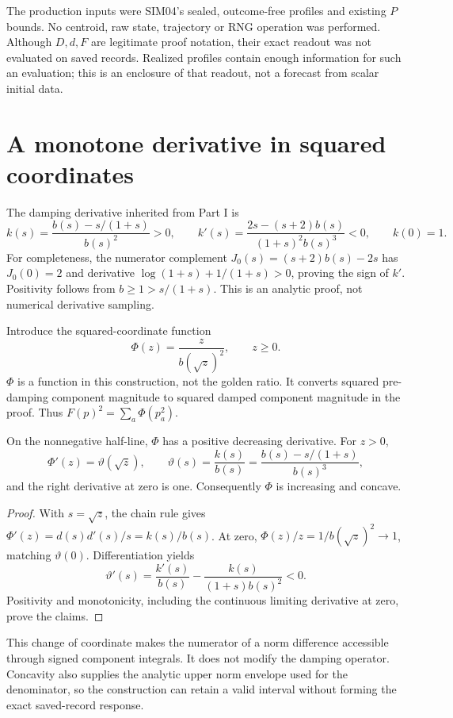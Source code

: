 \documentclass[11pt,a4paper]{article}
\begin{document}
The production inputs were SIM04's sealed, outcome-free profiles and existing $P$ bounds. No centroid, raw state, trajectory or RNG operation was performed. Although $D,d,F$ are legitimate proof notation, their exact readout was not evaluated on saved records. Realized profiles contain enough information for such an evaluation; this is an enclosure of that readout, not a forecast from scalar initial data.

\clearpage
\section{A monotone derivative in squared coordinates}\label{sec:derivative}
The damping derivative inherited from Part I is
\begin{equation}\label{eq:k}
k(s)=\frac{b(s)-s/(1+s)}{b(s)^2}>0,\qquad
k'(s)=\frac{2s-(s+2)b(s)}{(1+s)^2b(s)^3}<0,\qquad k(0)=1.
\end{equation}
For completeness, the numerator complement $J_0(s)=(s+2)b(s)-2s$ has $J_0(0)=2$ and derivative $\log(1+s)+1/(1+s)>0$, proving the sign of $k'$. Positivity follows from $b\ge1>s/(1+s)$. This is an analytic proof, not numerical derivative sampling.

Introduce the squared-coordinate function
\begin{equation}\label{eq:Phi}
\Phi(z)=\frac{z}{b(\sqrt z)^2},\qquad z\ge0.
\end{equation}
$\Phi$ is a function in this construction, not the golden ratio. It converts squared pre-damping component magnitude to squared damped component magnitude in the proof. Thus $F(p)^2=\sum_a\Phi(p_a^2)$.

\begin{proposition}\label{thm:concavity}
On the nonnegative half-line, $\Phi$ has a positive decreasing derivative. For $z>0$,
\begin{equation}\label{eq:theta}
\Phi'(z)=\vartheta(\sqrt z),\qquad
\vartheta(s)=\frac{k(s)}{b(s)}=\frac{b(s)-s/(1+s)}{b(s)^3},
\end{equation}
and the right derivative at zero is one. Consequently $\Phi$ is increasing and concave.
\end{proposition}
\begin{proof}
With $s=\sqrt z$, the chain rule gives $\Phi'(z)=d(s)d'(s)/s=k(s)/b(s)$. At zero, $\Phi(z)/z=1/b(\sqrt z)^2\to1$, matching $\vartheta(0)$. Differentiation yields
\[
\vartheta'(s)=\frac{k'(s)}{b(s)}-\frac{k(s)}{(1+s)b(s)^2}<0.
\]
Positivity and monotonicity, including the continuous limiting derivative at zero, prove the claims.
\end{proof}
This change of coordinate makes the numerator of a norm difference accessible through signed component integrals. It does not modify the damping operator. Concavity also supplies the analytic upper norm envelope used for the denominator, so the construction can retain a valid interval without forming the exact saved-record response.
\end{document}
